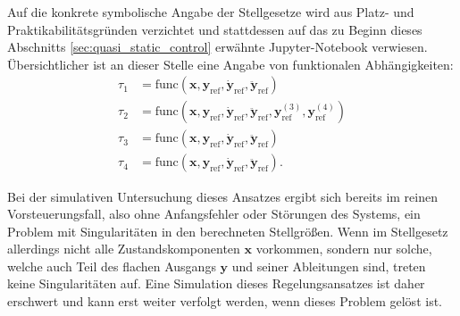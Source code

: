 Auf die konkrete symbolische Angabe der Stellgesetze wird aus Platz- und Praktikabilitätsgründen verzichtet und stattdessen auf das zu Beginn dieses Abschnitts \ref{sec:quasi_static_control} erwähnte Jupyter-Notebook verwiesen. Übersichtlicher ist an dieser Stelle eine Angabe von funktionalen Abhängigkeiten:
\begin{subequations}
	\begin{align}
		\tau_1 &= \mathrm{func}(\mathbf{x}, \mathbf{y}_{\mathrm{ref}}, \dot{\mathbf{y}}_{\mathrm{ref}}, \ddot{\mathbf{y}}_{\mathrm{ref}}) \\
		\tau_2 &= \mathrm{func}(\mathbf{x}, \mathbf{y}_{\mathrm{ref}}, \dot{\mathbf{y}}_{\mathrm{ref}}, \ddot{\mathbf{y}}_{\mathrm{ref}}, \mathbf{y}_{\mathrm{ref}}^{(3)}, \mathbf{y}_{\mathrm{ref}}^{(4)}) \\
		\tau_3 &=\mathrm{func}(\mathbf{x}, \mathbf{y}_{\mathrm{ref}}, \dot{\mathbf{y}}_{\mathrm{ref}}, \ddot{\mathbf{y}}_{\mathrm{ref}}) \\
		\tau_4 &= \mathrm{func}(\mathbf{x}, \mathbf{y}_{\mathrm{ref}}, \dot{\mathbf{y}}_{\mathrm{ref}}, \ddot{\mathbf{y}}_{\mathrm{ref}}).
	\end{align}
\end{subequations}

Bei der simulativen Untersuchung dieses Ansatzes ergibt sich bereits im reinen Vorsteuerungsfall, also ohne Anfangsfehler oder Störungen des Systems, ein Problem mit Singularitäten in den berechneten Stellgrößen. Wenn im Stellgesetz allerdings nicht alle Zustandskomponenten $\mathbf{x}$ vorkommen, sondern nur solche, welche auch Teil des flachen Ausgangs $\mathbf{y}$ und seiner Ableitungen sind, treten keine Singularitäten auf. Eine Simulation dieses Regelungsansatzes ist daher erschwert und kann erst weiter verfolgt werden, wenn dieses Problem gelöst ist.

